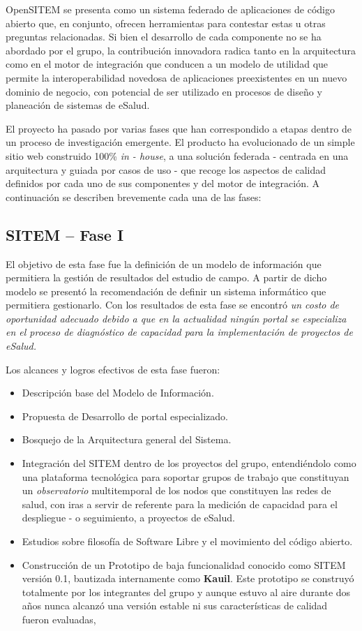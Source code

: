 OpenSITEM se presenta como un sistema federado de aplicaciones de código abierto que, en conjunto, ofrecen herramientas para contestar estas u otras preguntas relacionadas. Si bien el desarrollo de cada componente no se ha abordado por el grupo, la contribución innovadora radica tanto en la arquitectura como en el motor de integración que conducen a un modelo de utilidad que permite la interoperabilidad novedosa de aplicaciones preexistentes en un nuevo dominio de negocio, con potencial de ser utilizado en procesos de diseño y planeación de sistemas de eSalud.

El proyecto ha pasado por varias fases que han correspondido a etapas dentro de un proceso de investigación emergente. El producto ha evolucionado de un simple sitio web construido 100\% \textit{in - house}, a una solución federada - centrada en una arquitectura y guiada por casos de uso - que recoge los aspectos de calidad definidos por cada uno de sus componentes y del motor de integración. A continuación se describen brevemente cada una de las fases:

\subsection{SITEM – Fase I}

El objetivo de esta fase fue la definición de un modelo de información que permitiera la gestión de resultados del estudio de campo. A partir de dicho modelo se presentó la recomendación de definir un sistema informático que permitiera gestionarlo. Con los resultados de esta fase se encontró \textit{un costo de oportunidad adecuado debido a que en la actualidad ningún portal se especializa en el proceso de diagnóstico de capacidad para la implementación de proyectos de eSalud.}

Los alcances y logros efectivos de esta fase fueron:

\begin{itemize}
\item Descripción base del Modelo de Información.
\item Propuesta de Desarrollo de portal especializado.
\item Bosquejo de la Arquitectura general del Sistema.
\item Integración del SITEM dentro de los proyectos del grupo, entendiéndolo como una plataforma tecnológica para soportar grupos de trabajo que constituyan un \textit{observatorio} multitemporal de los nodos que constituyen las redes de salud, con iras a servir de referente para la medición de capacidad para el despliegue - o seguimiento, a proyectos de eSalud.
\item Estudios sobre filosofía de Software Libre y el movimiento del código abierto.
\item Construcción de un Prototipo de baja funcionalidad conocido como SITEM versión 0.1, bautizada internamente como \textbf{Kauil}. Este prototipo se construyó totalmente por los integrantes del grupo y aunque estuvo al aire durante dos años nunca alcanzó una versión estable ni sus características de calidad fueron evaluadas,
\end{itemize}

